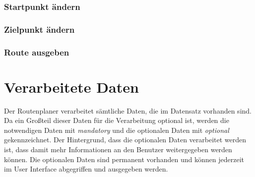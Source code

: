\documentclass[12pt, a4paper, ngerman]{article}
\begin{document}
\subsubsection{Startpunkt ändern \label{uc:StartpunktAendern}}
\begin{usecase}
\end{usecase}

\subsubsection{Zielpunkt ändern \label{uc:ZielpunktAendern}}
\begin{usecase}
	\uprecondition{\ref{uc:RouteBerechnen}}
\end{usecase}

\subsubsection{Route ausgeben \label{uc:RouteAusgeben}}
\begin{usecase}
\end{usecase}

\section{Verarbeitete Daten \label{attributBeschreibungen}}
Der Routenplaner verarbeitet sämtliche Daten, die im Datensatz vorhanden sind. Da ein Großteil dieser Daten für die Verarbeitung optional ist, werden die notwendigen Daten mit \textit{mandatory} und die optionalen Daten mit \textit{optional} gekennzeichnet. Der Hintergrund, dass die optionalen Daten verarbeitet werden ist, dass damit mehr Informationen an den Benutzer weitergegeben werden können. Die optionalen Daten sind permanent vorhanden und können jederzeit im User Interface abgegriffen und ausgegeben werden.
\end{document}
